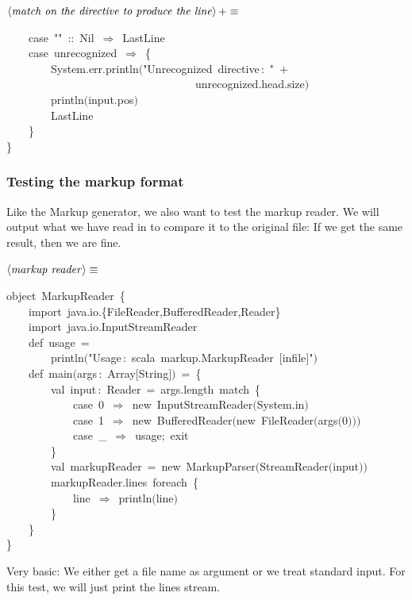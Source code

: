 \documentclass[a4paper,12pt]{article}
\begin{document}
$\left<\mbox{\emph{match on the directive to produce the line}}\right>+\equiv$
\begin{program}~~~~{\vem case}~""~{\rm :}{\rm :}~Nil~$\Rightarrow$~LastLine
\\~~~~{\vem case}~unrecognized~$\Rightarrow$~{\small\{}
\\~~~~~~~~System.err.println$($"Unrecognized~directive\,{\rm :}~"~$+$
\\~~~~~~~~~~~~~~~~~~~~~~~~~~~~~~~~~~unrecognized.head.size$)$
\\~~~~~~~~println$($input.pos$)$
\\~~~~~~~~LastLine
\\~~~~{\small\}}
\\{\small\}}
\\[0.5em]\end{program}
\subsubsection{Testing the markup format}
Like the Markup generator, we also want to test the markup reader.
We will output what we have read in to compare it to the original
file: If we get the same result, then we are fine.

$\left<\mbox{\emph{markup reader}}\right>\equiv$
\begin{program}{\vem object}~MarkupReader~{\small\{}
\\~~~~{\vem import}~java.io.{\small\{}FileReader,BufferedReader,Reader{\small\}}
\\~~~~{\vem import}~java.io.InputStreamReader
\\[0.5em]~~~~{\vem def}~usage~=
\\~~~~~~~~println$($"Usage\,{\rm :}~scala~markup.MarkupReader~$[$infile$]$"$)$
\\[0.5em]~~~~{\vem def}~main$($args\,{\rm :}~Array$[$String$]$$)$~=~{\small\{}
\\~~~~~~~~{\vem val}~input\,{\rm :}~Reader~=~args.length~{\vem match}~{\small\{}
\\~~~~~~~~~~~~{\vem case}~0~$\Rightarrow$~{\vem new}~InputStreamReader$($System.in$)$
\\~~~~~~~~~~~~{\vem case}~1~$\Rightarrow$~{\vem new}~BufferedReader$(${\vem new}~FileReader$($args$($0$)$$)$$)$
\\~~~~~~~~~~~~{\vem case}~\_~$\Rightarrow$~usage;~exit
\\~~~~~~~~{\small\}}
\\~~~~~~~~{\vem val}~markupReader~=~{\vem new}~MarkupParser$($StreamReader$($input$)$$)$
\\~~~~~~~~markupReader.lines~foreach~{\small\{}
\\~~~~~~~~~~~~line~$\Rightarrow$~println$($line$)$
\\~~~~~~~~{\small\}}
\\~~~~{\small\}}
\\{\small\}}
\\[0.5em]\end{program}
Very basic: We either get a file name as argument or we treat standard input. For
this test, we will just print the lines stream.
\end{document}
